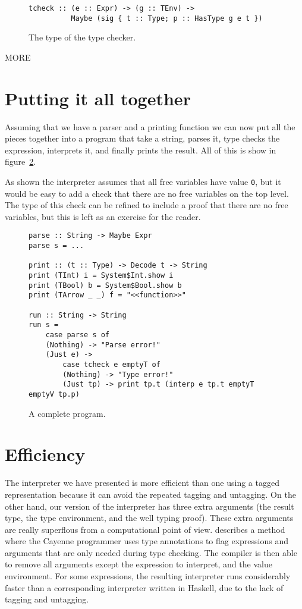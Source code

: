 \documentclass{llncs}[12pt]             %
\newcommand\tmp[1]{{\sf #1}}
\newcommand{\te}[1]{{\tt #1}}
\begin{document}
\begin{figure}
\begin{verbatim}
tcheck :: (e :: Expr) -> (g :: TEnv) -> 
          Maybe (sig { t :: Type; p :: HasType g e t })
\end{verbatim}
\caption{The type of the type checker.}
\label{fig:tchecktype}
\end{figure}

\tmp{MORE}

\section{Putting it all together}
Assuming that we have a parser and a printing function we can now
put all the pieces together into a program that take a string,
parses it, type checks the expression, interprets it, and finally
prints the result.
All of this is show in
figure~\ref{fig:pp}.

As shown the interpreter assumes that all free variables have value \te{0},
but it would be easy to add a check that there are no free variables
on the top level.  The type of this check can be refined to include
a proof that there are no free variables, but this is left as an exercise
for the reader.

\begin{figure}
\begin{verbatim}
parse :: String -> Maybe Expr
parse s = ...

print :: (t :: Type) -> Decode t -> String
print (TInt) i = System$Int.show i
print (TBool) b = System$Bool.show b
print (TArrow _ _) f = "<<function>>"

run :: String -> String
run s =
    case parse s of
    (Nothing) -> "Parse error!"
    (Just e) ->
        case tcheck e emptyT of
        (Nothing) -> "Type error!"
        (Just tp) -> print tp.t (interp e tp.t emptyT emptyV tp.p)
\end{verbatim}
\caption{A complete program.}
\label{fig:pp}
\end{figure}



\section{Efficiency}
The interpreter we have presented is more efficient than one
using a tagged representation because it can avoid the repeated
tagging and untagging.  On the other hand, our version of the
interpreter has three extra arguments (the result type, the
type environment, and the well typing proof).  These extra
arguments are really superflous from a computational point of
view. \cite{carlsson:disposable} describes a method where the
Cayenne programmer uses type annotations to flag expressions and
arguments that are only needed during type checking. The compiler is
then able to remove all arguments except the expression to interpret, and the
value environment. For some expressions, the resulting interpreter runs
considerably faster than a corresponding interpreter written in
Haskell, due to the lack of tagging and untagging.
\end{document}
